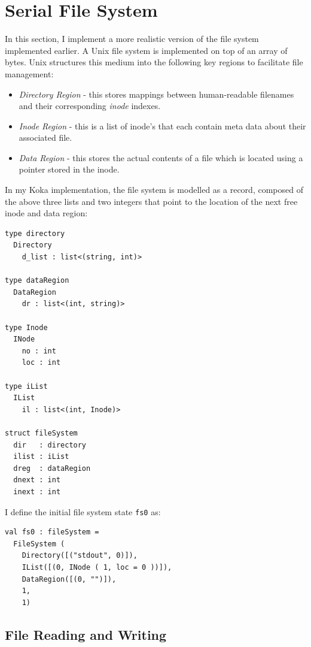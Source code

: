 \documentclass[logo,bsc,singlespacing,parskip]{infthesis}
\begin{document}
\section{Serial File System}
In this section, I implement a more realistic version of the file system implemented earlier. A Unix file system is implemented on top of an array of bytes. Unix structures this medium into the following key regions to facilitate file management:
\begin{itemize}
    \item \textit{Directory Region} - this stores mappings between human-readable filenames and their corresponding \textit{inode} indexes.
    \item \textit{Inode Region} - this is a list of inode's that each contain  meta data about their associated file.
    \item \textit{Data Region} - this stores the actual contents of a file which is located using a pointer stored in the inode.
\end{itemize}

In my Koka implementation, the file system is modelled as a record, composed of the above three lists and two integers that point to the location of the next free inode and data region:

\begin{lstlisting}
type directory 
  Directory
    d_list : list<(string, int)>

type dataRegion 
  DataRegion
    dr : list<(int, string)>

type Inode
  INode
    no : int
    loc : int

type iList 
  IList
    il : list<(int, Inode)> 

struct fileSystem
  dir   : directory
  ilist : iList
  dreg  : dataRegion
  dnext : int
  inext : int

\end{lstlisting}

I define the initial file system state \texttt{fs0} as:
\begin{lstlisting}
val fs0 : fileSystem =
  FileSystem (
    Directory([("stdout", 0)]),
    IList([(0, INode ( 1, loc = 0 ))]),
    DataRegion([(0, "")]),
    1,
    1)
\end{lstlisting}

\subsection{File Reading and Writing}
\end{document}
